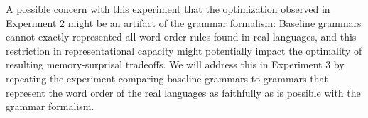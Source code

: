 


A possible concern with this experiment that the optimization observed in Experiment 2 might be an artifact of the grammar formalism:
Baseline grammars cannot exactly represented all word order rules found in real languages, and this restriction in representational capacity might potentially impact the optimality of resulting memory-surprisal tradeoffs.
We will address this in Experiment 3 by repeating the experiment comparing baseline grammars to grammars that represent the word order of the real languages as faithfully as is possible with the grammar formalism.


